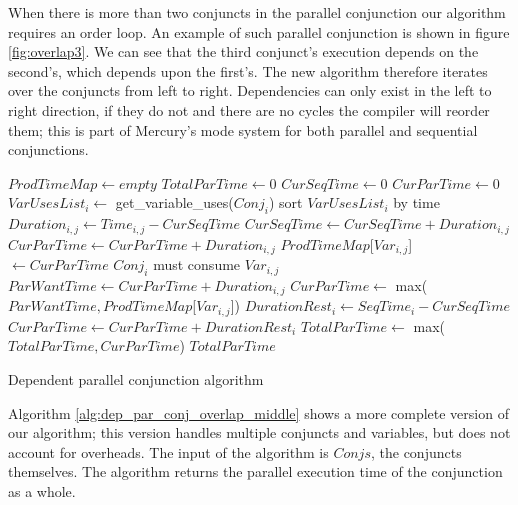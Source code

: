 When there is more than two conjuncts in the parallel conjunction our
algorithm requires an order loop.
An example of such parallel conjunction is shown in figure
\ref{fig:overlap3}.
We can see that the third conjunct's execution depends on the second's,
which depends upon the first's.
The new algorithm therefore iterates over the conjuncts from left to right.
Dependencies can only exist in the left to right direction,
if they do not and there are no cycles the compiler will reorder them;
this is part of Mercury's mode system for both parallel and sequential
conjunctions.

\begin{algorithm}[tb]
\begin{algorithmic}[5]
    \State $ProdTimeMap \gets empty$
    \State $TotalParTime \gets 0$
        \State $CurSeqTime \gets 0$
        \State $CurParTime \gets 0$
        \State $VarUsesList_i \gets$ get\_variable\_uses($Conj_i$)
        \State sort $VarUsesList_i$ by time
            \State $Duration_{i, j} \gets Time_{i, j} - CurSeqTime$
            \State $CurSeqTime \gets CurSeqTime + Duration_{i, j}$
                \State $CurParTime \gets CurParTime + Duration_{i, j}$
                \State $ProdTimeMap$[$Var_{i, j}$]~$ \gets CurParTime$
            \Else
                \Comment $Conj_i$ must consume $Var_{i, j}$
                \State $ParWantTime \gets CurParTime + Duration_{i, j}$
                \State $CurParTime \gets$
                    max($ParWantTime, ProdTimeMap$[$Var_{i, j}$])
            \EndIf
        \EndFor
        \State $DurationRest_i \gets SeqTime_i - CurSeqTime$
        \State $CurParTime \gets CurParTime + DurationRest_i$
        \State $TotalParTime \gets$ max($TotalParTime, CurParTime$)
    \EndFor
    \State \Return $TotalParTime$
\EndProcedure
\end{algorithmic}
\caption{Dependent parallel conjunction algorithm}
\label{alg:dep_par_conj_overlap_middle}
\end{algorithm}

Algorithm \ref{alg:dep_par_conj_overlap_middle} shows a more complete
version of our algorithm;
this version handles multiple conjuncts and variables,
but does not account for overheads.
The input of the algorithm is $Conjs$,
the conjuncts themselves.
The algorithm returns the parallel execution time of the conjunction as a
whole.

